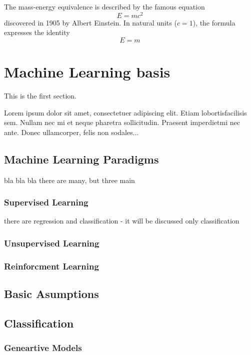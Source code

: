 \documentclass[12pt]{article}
\theoremstyle{definition}
\DeclareRobustCommand{\[}{\begin{equation}}
\DeclareRobustCommand{\]}{\end{equation}}
\begin{document}
The mass-energy equivalence is described by the famous equation
\[ E=mc^2 \]
discovered in 1905 by Albert Einstein. 
In natural units ($c = 1$), the formula expresses the identity
\begin{equation}
E=m
\end{equation}




 
\section{Machine Learning basis}


This is the first section.

Lorem  ipsum  dolor  sit  amet,  consectetuer  adipiscing  
elit.   Etiam  lobortisfacilisis sem.  Nullam nec mi et 
neque pharetra sollicitudin.  Praesent imperdietmi nec ante. 
Donec ullamcorper, felis non sodales...



\subsection{Machine Learning Paradigms}
bla bla bla there are many, but three main

\subsubsection{Supervised Learning}
there are regression and classification - it will be discussed only classification
\subsubsection{Unsupervised Learning}
\subsubsection{Reinforcment Learning}

\subsection{Basic Asumptions}
\subsection{Classification}
\subsubsection{Geneartive Models}
\end{document}
